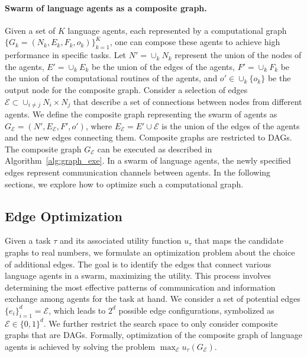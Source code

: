 \documentclass{article}
\theoremstyle{plain}
\theoremstyle{definition}
\theoremstyle{remark}
\begin{document}
\paragraph{Swarm of language agents as a composite graph.} Given a set of $K$ language agents, each represented by a computational graph $\{G_k=(N_k, E_k, F_k, o_k)\}_{k=1}^K$, one can compose these agents to achieve high performance in specific tasks.
Let $N'=\cup_k N_k$ represent the union of the nodes of the agents, $E' = \cup_k E_k$ be the union of the edges of the agents, $F'=\cup_k F_k$ be the union of the computational routines of the agents, and $o'\in \cup_k\{o_k\}$ be the output node for the composite graph.
Consider a selection of edges $\mathcal{E} \subset \cup_{i\neq j} N_i \times N_j$ that describe a set of connections between nodes from different agents.
We define the composite graph representing the swarm of agents as $G_{\mathcal{E}}=(N', E_{\mathcal{E}}, F', o')$, where $E_{\mathcal{E}} = E' \cup \mathcal{E}$ is the union of the edges of the agents and the new edges connecting them.
Composite graphs are restricted to DAGs.
The composite graph $G_{\mathcal{E}}$ can be executed as described in Algorithm~\ref{alg:graph_exe}.
In a swarm of language agents, the newly specified edges represent communication channels between agents.
In the following sections, we explore how to optimize such a computational graph.

\subsection{Edge Optimization}
Given a task $\tau$ and its associated utility function $u_\tau$ that maps the candidate graphs to real numbers,
we formulate an optimization problem about the choice of additional edges. 
The goal is to identify the edges that connect various language agents in a swarm, maximizing the utility. This process involves determining the most effective patterns of communication and information exchange among agents for the task at hand.
We consider a set of potential edges $\{e_i\}_{i=1}^d = \mathcal{E}$, which leads to $2^d$ possible edge configurations, symbolized as $\mathcal{E} \in \{0,1\}^d$. We further restrict the search space to only consider composite graphs that are DAGs.
Formally, optimization of the composite graph of language agents is achieved by solving the problem $\max_{\mathcal{E}} u_{\tau}(G_{\mathcal{E}})$.
\end{document}
